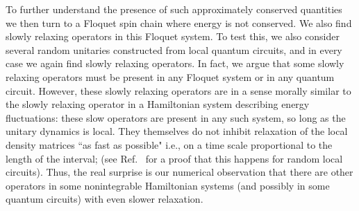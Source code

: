 \documentclass[twocolumn,superscriptaddress, prl,showpacs]{revtex4-1}
\begin{document}
To further understand the presence of such approximately conserved quantities we then turn to a Floquet spin chain where energy is not conserved.
We also find slowly relaxing operators in this Floquet system.
To test this, we also consider several random unitaries constructed from local quantum circuits, and in every case we again find slowly relaxing operators.
In fact, we argue that some slowly relaxing operators must be present in any Floquet system or in any quantum circuit.
However, these slowly relaxing operators are in a sense morally similar to the slowly relaxing operator in a Hamiltonian system describing energy fluctuations: these
slow operators are present in any such system, so long as the unitary dynamics is local.  They themselves do not inhibit relaxation of the local density matrices ``as fast as possible" i.e., on a time scale proportional to the length of the interval;
(see Ref.~ for a proof that this happens for random local circuits).
Thus, the real surprise is our numerical observation that there are other operators in some nonintegrable Hamiltonian systems (and possibly in some quantum circuits) with even slower relaxation.
\end{document}
